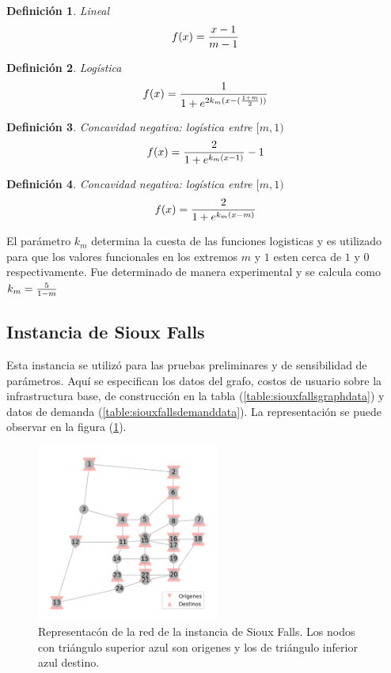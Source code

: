\documentclass{article}
\newtheorem{definition}{Definición}
\begin{document}
  \begin{definition}
    Lineal
    \begin{align}
        f(x) = {x -1 \over m - 1}
    \end{align}
  \end{definition}

  \begin{definition}
    Logística
    \begin{align}
        f(x) = {1 \over 1 + e^{2k_m(x - ({1 + m \over 2}))}}
    \end{align}
  \end{definition}

  \begin{definition}
    Concavidad negativa: logística entre $[m, 1)$
    \begin{align}
        f(x) = {2 \over 1 + e^{k_m(x - 1)}} - 1
    \end{align}
  \end{definition}

  \begin{definition}
    Concavidad negativa: logística entre $[m, 1)$
    \begin{align}
        f(x) = {2 \over 1 + e^{k_m(x - m)}}
    \end{align}
  \end{definition}

  El parámetro $k_m$ determina la cuesta de las funciones logisticas y es utilizado para que los valores funcionales en los extremos $m$ y $1$ esten cerca de $1$ y $0$ respectivamente. Fue determinado de manera experimental y se calcula como $k_m = {5 \over 1 - m}$

  \subsection*{Instancia de Sioux Falls}

  Esta instancia se utilizó para las pruebas preliminares y de sensibilidad de parámetros. Aquí se especifican los datos del grafo, costos de usuario sobre la infrastructura base, de construcción en la tabla (\ref{table:siouxfallsgraphdata}) y datos de demanda (\ref{table:siouxfallsdemanddata}). La representación se puede observar en la figura (\ref{fig:siouxfallsapendix}).

  \begin{figure}[h!]
    \centering
    \includegraphics[width=6cm]{../resources/sioux_falls_odpairs.png}
    \caption{Representacón de la red de la instancia de Sioux Falls. Los nodos con triángulo superior azul son origenes y los de triángulo inferior azul destino.}
    \label{fig:siouxfallsapendix}
  \end{figure}
\end{document}
